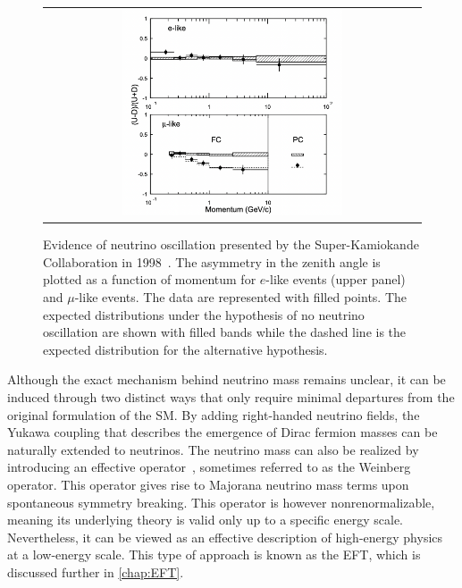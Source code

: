 \begin{figure}[tbh!]
 \begin{center}
 \begin{tabular}{c}
 \includegraphics[width=0.6\textwidth]{figures/Part1/BSM/SuperK}
 \end{tabular}
 \caption{Evidence of neutrino oscillation presented by the Super-Kamiokande Collaboration in 1998~\cite{Super-Kamiokande:1998kpq}. The asymmetry in the zenith angle is plotted as a function of momentum for $e$-like events (upper panel) and $\mu$-like events. The data are represented with filled points. The expected distributions under the hypothesis of no neutrino oscillation are shown with filled bands while the dashed line is the expected distribution for the alternative hypothesis.}
 \label{fig:SuperK}
 \end{center}
\end{figure}

Although the exact mechanism behind neutrino mass remains unclear, it can be induced through two distinct ways that only require minimal departures from the original formulation of the \ac{SM}. By adding right-handed neutrino fields, the Yukawa coupling \cite{Weinberg:1967tq} that describes the emergence of Dirac fermion masses can be naturally extended to neutrinos. The neutrino mass can also be realized by introducing an effective operator~\cite{Weinberg:1979sa}, sometimes referred to as the Weinberg operator. This operator gives rise to Majorana neutrino mass terms upon spontaneous symmetry breaking. This operator is however nonrenormalizable, meaning its underlying theory is valid only up to a specific energy scale. Nevertheless, it can be viewed as an effective description of high-energy physics at a low-energy scale. This type of approach is known as the \ac{EFT}, which is discussed further in \autoref{chap:EFT}.

